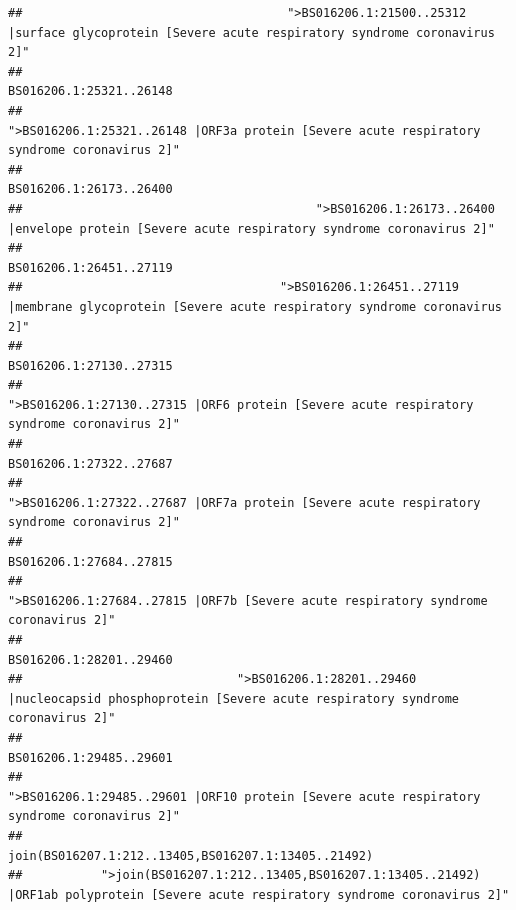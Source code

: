 \documentclass[
]{article}
\begin{document}
\begin{verbatim}
##                                     ">BS016206.1:21500..25312 |surface glycoprotein [Severe acute respiratory syndrome coronavirus 2]" 
##                                                                                                                BS016206.1:25321..26148 
##                                            ">BS016206.1:25321..26148 |ORF3a protein [Severe acute respiratory syndrome coronavirus 2]" 
##                                                                                                                BS016206.1:26173..26400 
##                                         ">BS016206.1:26173..26400 |envelope protein [Severe acute respiratory syndrome coronavirus 2]" 
##                                                                                                                BS016206.1:26451..27119 
##                                    ">BS016206.1:26451..27119 |membrane glycoprotein [Severe acute respiratory syndrome coronavirus 2]" 
##                                                                                                                BS016206.1:27130..27315 
##                                             ">BS016206.1:27130..27315 |ORF6 protein [Severe acute respiratory syndrome coronavirus 2]" 
##                                                                                                                BS016206.1:27322..27687 
##                                            ">BS016206.1:27322..27687 |ORF7a protein [Severe acute respiratory syndrome coronavirus 2]" 
##                                                                                                                BS016206.1:27684..27815 
##                                                    ">BS016206.1:27684..27815 |ORF7b [Severe acute respiratory syndrome coronavirus 2]" 
##                                                                                                                BS016206.1:28201..29460 
##                              ">BS016206.1:28201..29460 |nucleocapsid phosphoprotein [Severe acute respiratory syndrome coronavirus 2]" 
##                                                                                                                BS016206.1:29485..29601 
##                                            ">BS016206.1:29485..29601 |ORF10 protein [Severe acute respiratory syndrome coronavirus 2]" 
##                                                                                    join(BS016207.1:212..13405,BS016207.1:13405..21492) 
##           ">join(BS016207.1:212..13405,BS016207.1:13405..21492) |ORF1ab polyprotein [Severe acute respiratory syndrome coronavirus 2]" 

\end{verbatim}
\end{document}
